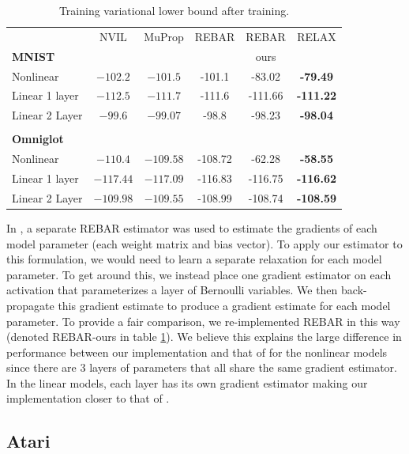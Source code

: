 \documentclass{article}
\begin{document}
\begin{table}[h]
\begin{center}
\begin{tabular}{l c c c c c} 
& NVIL & MuProp & REBAR & REBAR & RELAX \\
\textbf{MNIST} & & & \citet{tucker2017rebar} & ours & \\\midrule
Nonlinear      & $-102.2$ & $-101.5$ & -101.1  &  -83.02 &  \textbf{-79.49} \\
Linear 1 layer  & $-112.5$ & $-111.7$ & -111.6 & -111.66 & \textbf{-111.22} \\ 
Linear 2 Layer  & $-99.6$ & $-99.07$ & -98.8  & -98.23 & \textbf{-98.04} \\\\
\textbf{Omniglot}\\ \midrule
Nonlinear      & $-110.4$  & $-109.58$ & -108.72  & -62.28 & \textbf{-58.55} \\
Linear 1 layer & $-117.44$ & $-117.09$ & -116.83  & -116.75 & \textbf{-116.62} \\ 
Linear 2 Layer & $-109.98$ & $-109.55$ & -108.99  & -108.74 & \textbf{-108.59}
\end{tabular}
\end{center}
\label{tab:vae}
\caption{Training variational lower bound after training.}
\end{table}

In \citep{tucker2017rebar}, a separate REBAR estimator was used to estimate the gradients of each model parameter (each weight matrix and bias vector).
To apply our estimator to this formulation, we would need to learn a separate relaxation for each model parameter.
To get around this, we instead place one gradient estimator on each activation that parameterizes a layer of Bernoulli variables.
We then back-propagate this gradient estimate to produce a gradient estimate for each model parameter.
To provide a fair comparison, we re-implemented REBAR in this way (denoted REBAR-ours in table \ref{tab:vae}).
We believe this explains the large difference in performance between our implementation and that of \citep{tucker2017rebar} for the nonlinear models since there are 3 layers of parameters that all share the same gradient estimator.
In the linear models, each layer has its own gradient estimator making our implementation closer to that of \citep{tucker2017rebar}.



\subsection{Atari}
\end{document}
